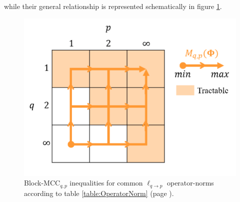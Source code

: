 while their general relationship is represented schematically in figure \ref{fig:BMCC_Inequalities}. 
\begin{figure}[!t]
\centering
\includegraphics[width=.4\textwidth,keepaspectratio]{images/BMCC_Inequalities.png} 
\centering
\caption{Block-MCC$_{q,p}$ inequalities for common $\ell_{q {\to} p}$ operator-norms according to table \ref{table:OperatorNorm} (page \pageref{table:OperatorNorm}).}
\label{fig:BMCC_Inequalities}
\end{figure}